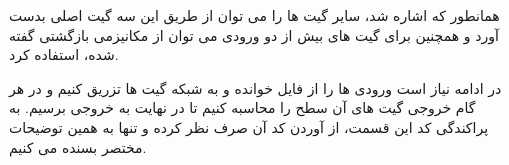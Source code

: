 همانطور که اشاره شد، سایر گیت ها را می توان از طریق این سه گیت اصلی
بدست آورد و همچنین برای گیت های بیش از دو ورودی می توان از مکانیزمی بازگشتی گفته شده، استفاده کرد.

در ادامه نیاز است ورودی ها را از فایل خوانده و به شبکه گیت ها تزریق کنیم و در هر گام خروجی گیت های آن سطح را محاسبه کنیم تا در نهایت به خروجی برسیم. به پراکندگی کد این قسمت، از آوردن کد آن صرف نظر کرده و تنها به همین توضیحات مختصر بسنده می کنیم.


